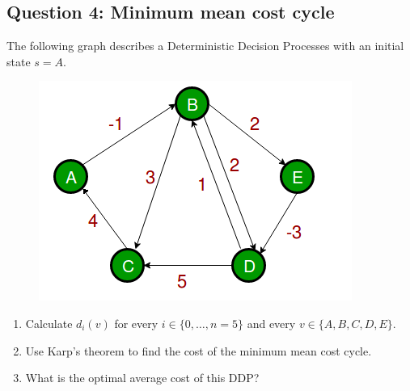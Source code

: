 \documentclass[11pt]{article}
\begin{document}
\subsection{Question 4: Minimum mean cost cycle}
The following graph describes a 	Deterministic Decision Processes with an initial state $s=A$.

\begin{figure}[ht!]
  \centering
  \includegraphics[width=.6780\linewidth]{graph for min mean cost cycle.png}
\end{figure}




\begin{enumerate}
\item Calculate $d_i(v)$ for every $i\in \{0,\dots,n=5\}$ and every $v\in \{A,B,C,D,E\}$.
\item Use Karp's theorem to find the cost of the minimum mean cost cycle.
\item What is the optimal average cost of this DDP?
\end{enumerate}




\end{document}
